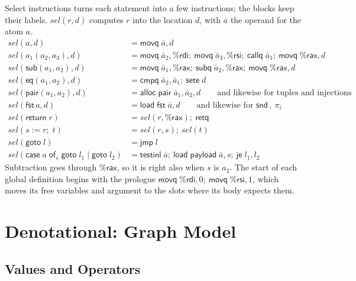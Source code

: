 \documentclass[10pt]{article}
\theoremstyle{acmplain}
\newcommand{\key}[1]{\mathsf{#1}}
\newcommand{\pass}[1]{\mathit{#1}}
\newcommand{\prj}[1]{\pi_{#1}\,}
\newcommand{\pair}[2]{\key{pair}(#1, #2)}
\newcommand{\FST}{\key{fst}\,}
\newcommand{\SND}{\key{snd}\,}
\newcommand{\assign}[3]{#1 \mathrel{:=} #2;\; #3}
\begin{document}
Select instructions turns each statement into a few instructions; the
blocks keep their labels. $\pass{sel}(r, d)$ computes $r$ into the
location $d$, with $\bar{a}$ the operand for the atom $a$.
\begin{align*}
  \pass{sel}(a, d) &= \key{movq}\; \bar{a}, d \\
  \pass{sel}(a_1(a_2, a_3), d) &= \key{movq}\; \bar{a}_2, \%\key{rdi};\
    \key{movq}\; \bar{a}_3, \%\key{rsi};\ \key{callq}\; \bar{a}_1;\
    \key{movq}\; \%\key{rax}, d \\
  \pass{sel}(\key{sub}(a_1, a_2), d) &= \key{movq}\; \bar{a}_1, \%\key{rax};\
    \key{subq}\; \bar{a}_2, \%\key{rax};\ \key{movq}\; \%\key{rax}, d \\
  \pass{sel}(\key{eq}(a_1, a_2), d) &= \key{cmpq}\; \bar{a}_2, \bar{a}_1;\ \key{sete}\; d \\
  \pass{sel}(\pair{a_1}{a_2}, d) &= \key{alloc}\; \key{pair}\; \bar{a}_1, \bar{a}_2, d
    \qquad\text{and likewise for tuples and injections} \\
  \pass{sel}(\FST a, d) &= \key{load}\; \key{fst}\; \bar{a}, d
    \qquad\text{and likewise for } \SND,\ \prj{i} \\[1ex]
  \pass{sel}(\key{return}\; r) &= \pass{sel}(r, \%\key{rax});\ \key{retq} \\
  \pass{sel}(\assign{s}{r}{t}) &= \pass{sel}(r, s);\ \pass{sel}(t) \\
  \pass{sel}(\key{goto}\; l) &= \key{jmp}\; l \\
  \pass{sel}(\key{case}\;a\;\key{of}_{s}\;\key{goto}\;l_1 \mid \key{goto}\;l_2) &=
    \key{testinl}\; \bar{a};\ \key{load}\; \key{payload}\; \bar{a}, s;\ \key{je}\; l_1, l_2
\end{align*}
Subtraction goes through $\%\key{rax}$, so it is right also when $s$ is
$a_2$. The start of each global definition begins with the prologue
$\key{movq}\; \%\key{rdi}, 0;\ \key{movq}\; \%\key{rsi}, 1$, which moves its
free variables and argument to the slots where its body expects them.

\section{Denotational: Graph Model}\label{sec:u-den}

\subsection{Values and Operators}
\end{document}
